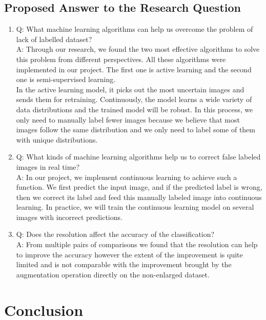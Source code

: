 \documentclass[lang=english,inputenc=utf8,fontsize=10pt]{ldvarticle}
\begin{document}
\subsection{Proposed Answer to the Research Question}
\begin{enumerate}
    \item 
    Q: What machine learning algorithms can help us overcome the problem of lack of labelled dataset?\\
    A: Through our research, we found the two most effective algorithms to solve this problem from different perspectives. All these algorithms were implemented in our project. The first one is active learning and the second one is semi-supervised learning.\\
    In the active learning model, it picks out the most uncertain images and sends them for retraining. Continuously, the model learns a wide variety of data distributions and the trained model will be robust. In this process, we only need to manually label fewer images because we believe that most images follow the same distribution and we only need to label some of them with unique distributions.
    \item 
    Q: What kinds of machine learning algorithms help us to correct false labeled images in real time?\\
    A: In our project, we implement continuous learning to achieve such a function. We first predict the input image, and if the predicted label is wrong, then we correct its label and feed this manually labeled image into continuous learning. In practice, we will train the continuous learning model on several images with incorrect predictions.\\
    \item 
    Q: Does the resolution affect the accuracy of the classification?\\
    A: From multiple pairs of comparisons we found that the resolution can help to improve the accuracy however the extent of the improvement is quite limited and is not comparable with the improvement brought by the augmentation operation directly on the non-enlarged dataset.\\
\end{enumerate}

\newpage

\section{Conclusion}
\end{document}
